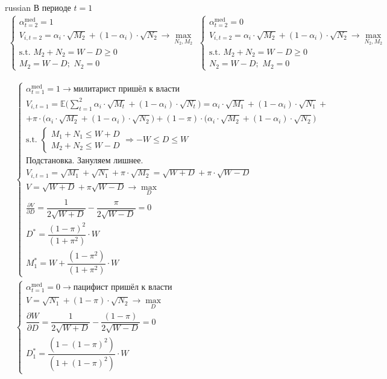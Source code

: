 \documentclass{article}
\begin{document}
\begin{otherlanguage*}{russian}
В периоде $ t = 1 $
\begin{align*}
\begin{cases} 
\alpha^{\text{med}}_{t=2} = 1 \\
V_{i, t=2} = \alpha_i \cdot \sqrt{M_2} + (1 - \alpha_i) \cdot \sqrt{N_2} \rightarrow \max_{N_2, M_2} \\
\text{s.t. } M_2 + N_2 = W - D \ge 0 \\
M_2 = W - D; \,\, N_2 = 0 
\end{cases}
\begin{cases}
\alpha^{\text{med}}_{t=2} = 0 \\
V_{i, t=2} = \alpha_i \cdot \sqrt{M_2} + (1 - \alpha_i) \cdot \sqrt{N_2} \rightarrow \max_{N_2, M_2} \\
\text{s.t. } M_2 + N_2 = W - D \ge 0 \\
N_2 = W - D; \,\, M_2 = 0 
\end{cases} 
\end{align*}

\begin{align*}
&\begin{cases}
\alpha_{t=1}^{\text{med}} = 1 \rightarrow \text{милитарист пришёл к власти} \\
V_{i, t=1} = \mathbb{E} \Big( \sum_{t=1}^2 \alpha_i \cdot \sqrt{M_t} + (1 - \alpha_i) \cdot \sqrt{N_t} \Big) = \alpha_i \cdot \sqrt{M_1} + (1 - \alpha_i) \cdot \sqrt{N_1} + \\ +  \pi \cdot \Big( \alpha_i \cdot \sqrt{M_2} + (1 - \alpha_i) \cdot \sqrt{N_2} \Big)  +  (1 - \pi)  \cdot \Big( \alpha_i \cdot \sqrt{M_2} + (1 - \alpha_i) \cdot \sqrt{N_2}  \Big) \\
\text{s.t. } \begin{cases} 
M_1 + N_1 \le W + D \\
M_2 + N_2 \le W - D 
\end{cases}  \Rightarrow - W \le D \le W \\
\text{Подстановка. Зануляем лишнее}.\\
V_{i, t=1} = \sqrt{M_1} + \sqrt{N_1} + \pi \cdot \sqrt{M_2} = \sqrt{W + D} + \pi \cdot \sqrt{W - D} \\
V = \sqrt{W + D} + \pi \sqrt{W - D} \rightarrow \max_{D} \\
\frac{\partial V}{\partial D} = \dfrac{1}{2 \sqrt{W + D}} - \dfrac{\pi}{2 \sqrt{W - D}} = 0 \\ 
D^* = \dfrac{(1 - \pi)^2}{(1 + \pi^2)} \cdot W \\
M^*_1 = W  + \dfrac{(1 - \pi^2)}{(1 + \pi^2)} \cdot W 
\end{cases} \\
&\begin{cases}
\alpha_{t=1}^{\text{med}} = 0 \rightarrow \text{пацифист пришёл к власти} \\
V = \sqrt{N_1} + (1 - \pi) \cdot \sqrt{N_2} \rightarrow \max_{D} \\ 
\dfrac{\partial W}{\partial D}  = \dfrac{1}{2 \sqrt{W + D}} - \dfrac{(1 - \pi)}{2 \sqrt{W - D}} = 0  \\
D^*_1 = \dfrac{(1 - (1 - \pi)^2)}{(1 + (1 - \pi)^2)} \cdot W 
\end{cases}
\end{align*}

\end{otherlanguage*}
\end{document}
